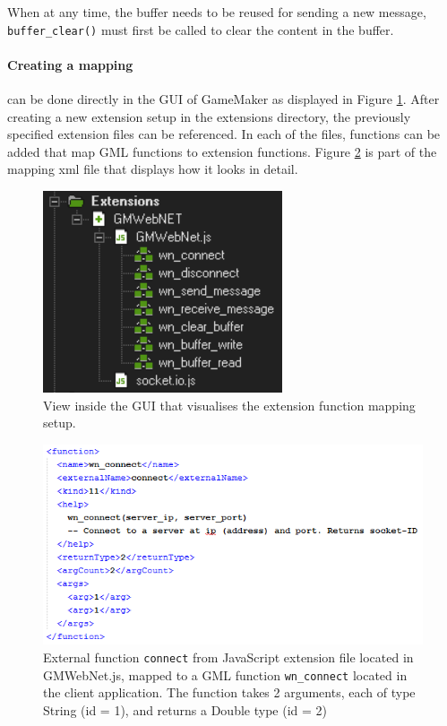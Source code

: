 \documentclass[bsc, 12pt, twoside, singlespacing, parskip, abbrevs, notimes, normalheadings, logo]{styles/infthesis}
\begin{document}
When at any time, the buffer needs to be reused for sending a new message, \texttt{buffer\_clear()} must first be called to clear the content in the buffer. 

\paragraph*{Creating a mapping}
can be done directly in the GUI of GameMaker as displayed in Figure \ref{fig:extension_folder}. After creating a new extension setup in the extensions directory, the previously specified extension files can be referenced. In each of the files, functions can be added that map GML functions to extension functions. Figure \ref{fig:xml_mapping} is part of the mapping xml file that displays how it looks in detail.

\begin{figure}[H]
\centering
\includegraphics[scale=1.2]{images/extensions_folder.png}
\caption{View inside the GUI that visualises the extension function mapping setup.}
\label{fig:extension_folder}
\vspace{1em}
\end{figure}

\begin{figure}[H]
\centering
\includegraphics[scale=1.2]{images/xml_mapping.png}
\caption{External function \texttt{connect} from JavaScript extension file located in GMWebNet.js, mapped to a GML function \texttt{wn\_connect} located in the client application. The function takes 2 arguments, each of type String (id = 1), and returns a Double type (id = 2)}
\label{fig:xml_mapping}
\vspace{1em}
\end{figure}
\end{document}
